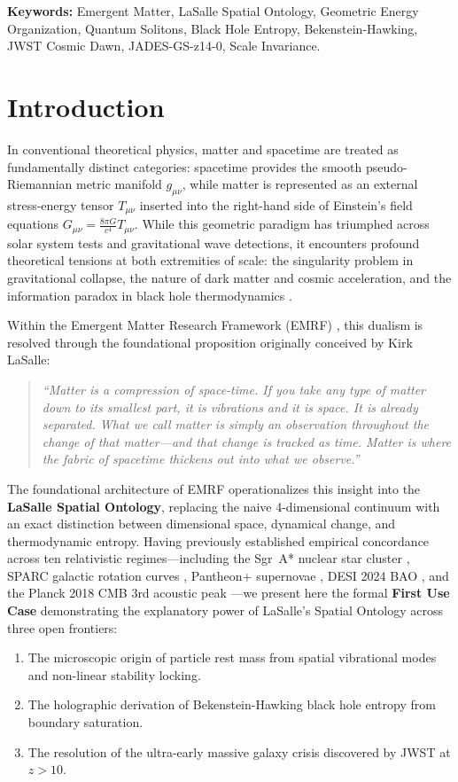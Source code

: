 \documentclass[11pt,a4paper]{article}
\begin{document}
\noindent\textbf{Keywords:} Emergent Matter, LaSalle Spatial Ontology, Geometric Energy Organization, Quantum Solitons, Black Hole Entropy, Bekenstein-Hawking, JWST Cosmic Dawn, JADES-GS-z14-0, Scale Invariance.

\newpage

\section{Introduction}

In conventional theoretical physics, matter and spacetime are treated as fundamentally distinct categories: spacetime provides the smooth pseudo-Riemannian metric manifold $g_{\mu\nu}$, while matter is represented as an external stress-energy tensor $T_{\mu\nu}$ inserted into the right-hand side of Einstein's field equations $G_{\mu\nu} = \frac{8\pi G}{c^4} T_{\mu\nu}$. While this geometric paradigm has triumphed across solar system tests and gravitational wave detections, it encounters profound theoretical tensions at both extremities of scale: the singularity problem in gravitational collapse, the nature of dark matter and cosmic acceleration, and the information paradox in black hole thermodynamics \cite{bekenstein1973, hawking1975}.

Within the Emergent Matter Research Framework (EMRF) \cite{lasalle2026emrf, lasalle2026zenodo}, this dualism is resolved through the foundational proposition originally conceived by Kirk LaSalle:
\begin{quote}
\textit{``Matter is a compression of space-time. If you take any type of matter down to its smallest part, it is vibrations and it is space. It is already separated. What we call matter is simply an observation throughout the change of that matter---and that change is tracked as time. Matter is where the fabric of spacetime thickens out into what we observe.''}
\end{quote}

The foundational architecture of EMRF operationalizes this insight into the \textbf{LaSalle Spatial Ontology}, replacing the naive 4-dimensional continuum with an exact distinction between dimensional space, dynamical change, and thermodynamic entropy. Having previously established empirical concordance across ten relativistic regimes---including the Sgr~A* nuclear star cluster \cite{gravity2026s301}, SPARC galactic rotation curves \cite{lelli2016sparc}, Pantheon+ supernovae \cite{brout2022}, DESI 2024 BAO \cite{desi2024}, and the Planck 2018 CMB 3rd acoustic peak \cite{planck2020}---we present here the formal \textbf{First Use Case} demonstrating the explanatory power of LaSalle's Spatial Ontology across three open frontiers:
\begin{enumerate}
    \item The microscopic origin of particle rest mass from spatial vibrational modes and non-linear stability locking.
    \item The holographic derivation of Bekenstein-Hawking black hole entropy from boundary saturation.
    \item The resolution of the ultra-early massive galaxy crisis discovered by JWST at $z > 10$.
\end{enumerate}
\end{document}
